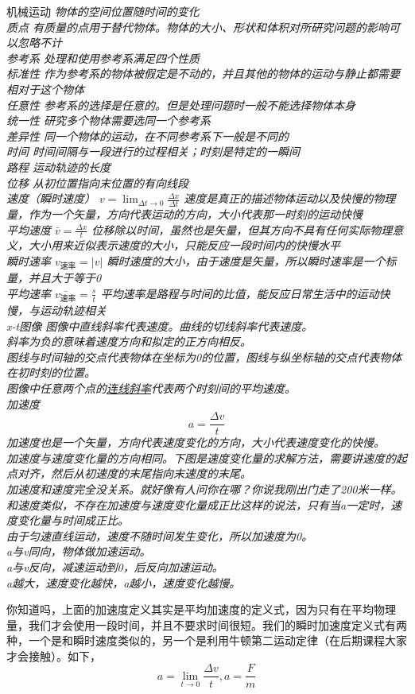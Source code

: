\documentclass[a4paper, 12pt]{article}
\newcommand{\defitem}[2]{
\noindent \textsf{#1} \hspace{1em} \itshape{#2} \\
}
\newcommand{\noticebox}[1]{
  \begin{arcbox}
    \normalfont #1
  \end{arcbox}
}
\begin{document}
\defitem{机械运动}{物体的空间位置随时间的变化}
\defitem{质点}{有质量的点用于替代物体。物体的大小、形状和体积对所研究问题的影响可以忽略不计}
\defitem{参考系}{处理和使用参考系满足四个性质}
\defitem{标准性}{作为参考系的物体被假定是不动的，并且其他的物体的运动与静止都需要相对于这个物体}
\defitem{任意性}{参考系的选择是任意的。但是处理问题时一般不能选择物体本身}
\defitem{统一性}{研究多个物体需要选同一个参考系}
\defitem{差异性}{同一个物体的运动，在不同参考系下一般是不同的}
\defitem{时间}{时间间隔与一段进行的过程相关；时刻是特定的一瞬间}
\defitem{路程}{运动轨迹的长度}
\defitem{位移}{从初位置指向末位置的有向线段}
\defitem{速度（瞬时速度）}{$v=\lim_{\Delta t\to0}\frac{\Delta x}{\Delta t}$ 速度是真正的描述物体运动以及快慢的物理量，作为一个矢量，方向代表运动的方向，大小代表那一时刻的运动快慢}
\defitem{平均速度}{$\bar{v}=\frac{\Delta x}{t}$ 位移除以时间，虽然也是矢量，但其方向不具有任何实际物理意义，大小用来近似表示速度的大小，只能反应一段时间内的快慢水平}
\defitem{瞬时速率}{$v_\text{速率}=|v|$ 瞬时速度的大小，由于速度是矢量，所以瞬时速率是一个标量，并且大于等于0}
\defitem{平均速率}{$\bar{v_\text{速率}}=\frac{s}{t}$ 平均速率是路程与时间的比值，能反应日常生活中的运动快慢，与运动轨迹相关}
\defitem{x-t图像}{
  图像中直线斜率代表速度。曲线的切线斜率代表速度。\\
  斜率为负的意味着速度方向和拟定的正方向相反。\\
  图线与时间轴的交点代表物体在坐标为0的位置，图线与纵坐标轴的交点代表物体在初时刻的位置。\\
  图像中任意两个点的\underline{连线斜率}代表两个时刻间的平均速度。
}
\defitem{加速度}{
  \[a=\frac{\Delta v}{t}\]
  加速度也是一个矢量，方向代表速度变化的方向，大小代表速度变化的快慢。\\
  加速度与速度变化量的方向相同。下图是速度变化量的求解方法，需要讲速度的起点对齐，然后从初速度的末尾指向末速度的末尾。\\
  加速度和速度完全没关系。就好像有人问你在哪？你说我刚出门走了200米一样。\\
  和速度类似，不存在加速度与速度变化量成正比这样的说法，只有当a一定时，速度变化量与时间成正比。\\
  由于匀速直线运动，速度不随时间发生变化，所以加速度为0。 \\
  a与v同向，物体做加速运动。\\
  a与v反向，减速运动到0，后反向加速运动。\\
  a越大，速度变化越快，a越小，速度变化越慢。
}
\noticebox{
  你知道吗，上面的加速度定义其实是平均加速度的定义式，因为只有在平均物理量，我们才会使用一段时间，并且不要求时间很短。我们的瞬时加速度定义式有两种，一个是和瞬时速度类似的，另一个是利用牛顿第二运动定律（在后期课程大家才会接触）。如下，
  \[a=\lim_{t\to0}\frac{\Delta v}{t},a= \frac Fm\]
}
\end{document}
